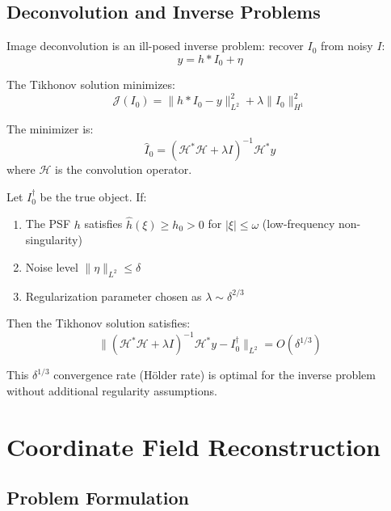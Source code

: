 \documentclass[twocolumn,11pt]{article}
\begin{document}
\subsection{Deconvolution and Inverse Problems}

Image deconvolution is an ill-posed inverse problem: recover $I_0$ from noisy $I$:
\begin{equation}
y = h * I_0 + \eta
\end{equation}

\begin{definition}
The Tikhonov solution minimizes:
\begin{equation}
\mathcal{J}(I_0) = \|h * I_0 - y\|_{L^2}^2 + \lambda \|I_0\|_{H^1}^2
\end{equation}

The minimizer is:
\begin{equation}
\hat{I}_0 = (\mathcal{H}^* \mathcal{H} + \lambda I)^{-1} \mathcal{H}^* y
\end{equation}
where $\mathcal{H}$ is the convolution operator.
\end{definition}

\begin{theorem}
Let $I_0^\dagger$ be the true object. If:
\begin{enumerate}
\item The PSF $h$ satisfies $\hat{h}(\xi) \geq h_0 > 0$ for $|\xi| \leq \omega$ (low-frequency non-singularity)
\item Noise level $\|\eta\|_{L^2} \leq \delta$
\item Regularization parameter chosen as $\lambda \sim \delta^{2/3}$
\end{enumerate}

Then the Tikhonov solution satisfies:
\begin{equation}
\|(\mathcal{H}^* \mathcal{H} + \lambda I)^{-1} \mathcal{H}^* y - I_0^\dagger\|_{L^2} = O(\delta^{1/3})
\end{equation}
\end{theorem}

This $\delta^{1/3}$ convergence rate (Hölder rate) is optimal for the inverse problem without additional regularity assumptions.

\section{Coordinate Field Reconstruction}

\subsection{Problem Formulation}
\end{document}
